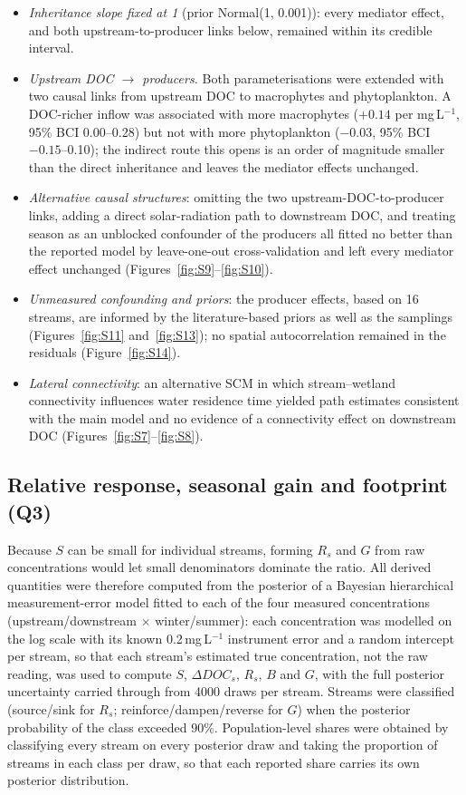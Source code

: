 \documentclass[11pt,a4paper]{article}
\begin{document}
\begin{itemize}
\item \emph{Inheritance slope fixed at 1} (prior Normal(1, 0.001)): every mediator effect, and both upstream-to-producer links below, remained within its credible interval.
\item \emph{Upstream DOC $\rightarrow$ producers.} Both parameterisations were extended with two causal links from upstream DOC to macrophytes and phytoplankton. A DOC-richer inflow was associated with more macrophytes ($+0.14$ per mg\,L$^{-1}$, 95\% BCI 0.00--0.28) but not with more phytoplankton ($-0.03$, 95\% BCI $-0.15$--0.10); the indirect route this opens is an order of magnitude smaller than the direct inheritance and leaves the mediator effects unchanged.
\item \emph{Alternative causal structures}: omitting the two upstream-DOC-to-producer links, adding a direct solar-radiation path to downstream DOC, and treating season as an unblocked confounder of the producers all fitted no better than the reported model by leave-one-out cross-validation and left every mediator effect unchanged (Figures~\ref{fig:S9}--\ref{fig:S10}).
\item \emph{Unmeasured confounding and priors}: the producer effects, based on 16 streams, are informed by the literature-based priors as well as the samplings (Figures~\ref{fig:S11} and~\ref{fig:S13}); no spatial autocorrelation remained in the residuals (Figure~\ref{fig:S14}).
\item \emph{Lateral connectivity}: an alternative SCM in which stream--wetland connectivity influences water residence time yielded path estimates consistent with the main model and no evidence of a connectivity effect on downstream DOC (Figures~\ref{fig:S7}--\ref{fig:S8}).
\end{itemize}

\subsection*{Relative response, seasonal gain and footprint (Q3)}

Because $S$ can be small for individual streams, forming $R_s$ and $G$ from raw concentrations would let small denominators dominate the ratio. All derived quantities were therefore computed from the posterior of a Bayesian hierarchical measurement-error model fitted to each of the four measured concentrations (upstream/downstream $\times$ winter/summer): each concentration was modelled on the log scale with its known 0.2\,mg\,L$^{-1}$ instrument error and a random intercept per stream, so that each stream's estimated true concentration, not the raw reading, was used to compute $S$, $\Delta DOC_s$, $R_s$, $B$ and $G$, with the full posterior uncertainty carried through from 4000 draws per stream. Streams were classified (source/sink for $R_s$; reinforce/dampen/reverse for $G$) when the posterior probability of the class exceeded 90\%. Population-level shares were obtained by classifying every stream on every posterior draw and taking the proportion of streams in each class per draw, so that each reported share carries its own posterior distribution.
\end{document}
